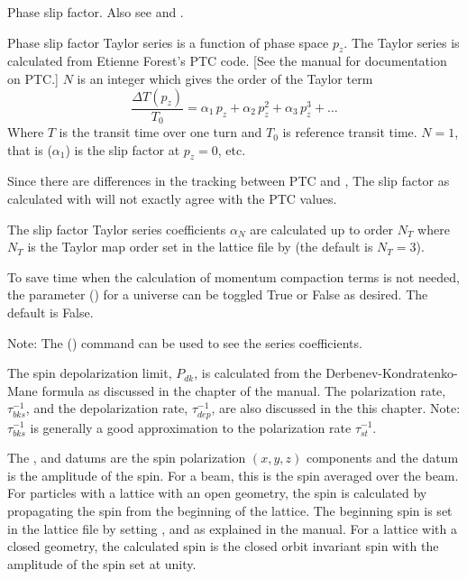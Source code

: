\begin{description}
{{{{{{  %
  \item[slip_factor_ptc.$N$, $N = 1, 2, 3, \ldots$] \Newline {}
Phase slip factor. Also see  and .

Phase slip factor Taylor series is a function of phase space $p_z$. The Taylor series is calculated
from Etienne Forest's PTC code. [See the \bmad manual for documentation on PTC.] $N$ is an integer
which gives the order of the Taylor term
\begin{equation}
  \frac{\Delta T(p_z)}{T_0} = \alpha_1 \, p_z + \alpha_2 \, p_z^2 + \alpha_3 \, p_z^3 + \ldots
\end{equation}
Where $T$ is the transit time over one turn and $T_0$ is reference transit time.
$N = 1$, that is  ($\alpha_1$) is the slip factor at $p_z = 0$, etc.

Since there are differences in the tracking between PTC and \bmad, The slip factor as calculated
with \bmad will not exactly agree with the PTC values.

The slip factor Taylor series coefficients $\alpha_N$ are calculated up to order $N_T$ where $N_T$ is the
Taylor map order set in the lattice file by  (the default is $N_T=3$). 

To save time when the calculation of momentum compaction terms is not needed, the  parameter
() for a universe can be toggled True or False as desired. The default is False.

Note: The  () command can be used to see the series coefficients.

  \item[spin.polarization_limit, .polarization_rate, .depolarization_rate] \Newline {}
The spin depolarization limit, $P_{dk}$, is calculated from the Derbenev-Kondratenko-Mane formula as
discussed in the  chapter of the \bmad manual.  The 
polarization rate, $\tau_{bks}^{-1}$, and the depolarization rate, $\tau_{dep}^{-1}$, are also
discussed in the this chapter. Note: $\tau_{bks}^{-1}$ is generally a good approximation to the
 polarization rate $\tau_{st}^{-1}$.

  \item[spin.x, .y, .z, .amp] \Newline {}
The ,  and  datums are the spin polarization $(x, y, z)$ components
and the  datum is the amplitude of the spin. For a beam, this is the spin averaged over
the beam.  For particles with a lattice with an open geometry, the spin is calculated by propagating
the spin from the beginning of the lattice. The beginning spin is set in the lattice file by setting
,  and  as explained in the \bmad
manual. For a lattice with a closed geometry, the calculated spin is the closed orbit invariant spin
with the amplitude of the spin set at unity.

}}}}}}
\end{description}
